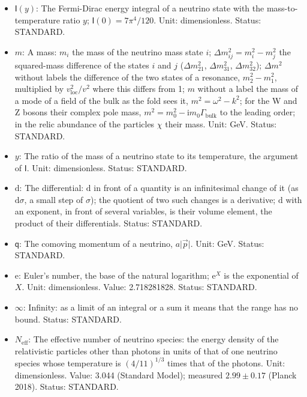 \documentclass[
  10pt,
]{article}
\begin{document}
\begin{itemize}
  \(\mathsf{T}_\gamma\): The temperature of the photons (of the CMB);
  \(\mathsf{T}_\gamma^{(0)}\) its value today. Unit: GeV (or K). Value:
  2.7255 K today. Status: STANDARD.
\item
  \(\mathsf{I}(y)\): The Fermi-Dirac energy integral of a neutrino state
  with the mass-to-temperature ratio \(y\);
  \(\mathsf{I}(0) = 7\pi^4/120\). Unit: dimensionless. Status: STANDARD.
\item
  \(m\): A mass: \(m_i\) the mass of the neutrino mass state \(i\);
  \(\Delta m_{ij}^2 = m_i^2 - m_j^2\) the squared-mass difference of the
  states \(i\) and \(j\) (\(\Delta m_{21}^2\), \(\Delta m_{31}^2\),
  \(\Delta m_{32}^2\)); \(\Delta m^2\) without labels the difference of
  the two states of a resonance, \(m_2^2 - m_1^2\), multiplied by
  \(v_{\mathrm{loc}}^2/v^2\) where this differs from 1; \(m\) without a
  label the mass of a mode of a field of the bulk as the fold sees it,
  \(m^2 = \omega^2 - k^2\); for the W and Z bosons their complex pole
  mass, \(m^2 = m_0^2 - \mathrm{i}m_0\Gamma_{\mathrm{bulk}}\) to the
  leading order; in the relic abundance of the particles \(\chi\) their
  mass. Unit: GeV. Status: STANDARD.
\item
  \(y\): The ratio of the mass of a neutrino state to its temperature,
  the argument of \(\mathsf{I}\). Unit: dimensionless. Status: STANDARD.
\item
  \(\mathrm{d}\): The differential: \(\mathrm{d}\) in front of a
  quantity is an infinitesimal change of it (as \(\mathrm{d}\sigma\), a
  small step of \(\sigma\)); the quotient of two such changes is a
  derivative; \(\mathrm{d}\) with an exponent, in front of several
  variables, is their volume element, the product of their
  differentials. Status: STANDARD.
\item
  \(\mathsf{q}\): The comoving momentum of a neutrino,
  \(a\lvert\vec p\rvert\). Unit: GeV. Status: STANDARD.
\item
  \(\mathrm{e}\): Euler's number, the base of the natural logarithm;
  \(\mathrm{e}^{X}\) is the exponential of \(X\). Unit: dimensionless.
  Value: 2.718281828. Status: STANDARD.
\item
  \(\infty\): Infinity: as a limit of an integral or a sum it means that
  the range has no bound. Status: STANDARD.
\item
  \(N_{\mathrm{eff}}\): The effective number of neutrino species: the
  energy density of the relativistic particles other than photons in
  units of that of one neutrino species whose temperature is
  \((4/11)^{1/3}\) times that of the photons. Unit: dimensionless.
  Value: 3.044 (Standard Model); measured \(2.99 \pm 0.17\) (Planck
  2018). Status: STANDARD.
\end{itemize}
\end{document}
